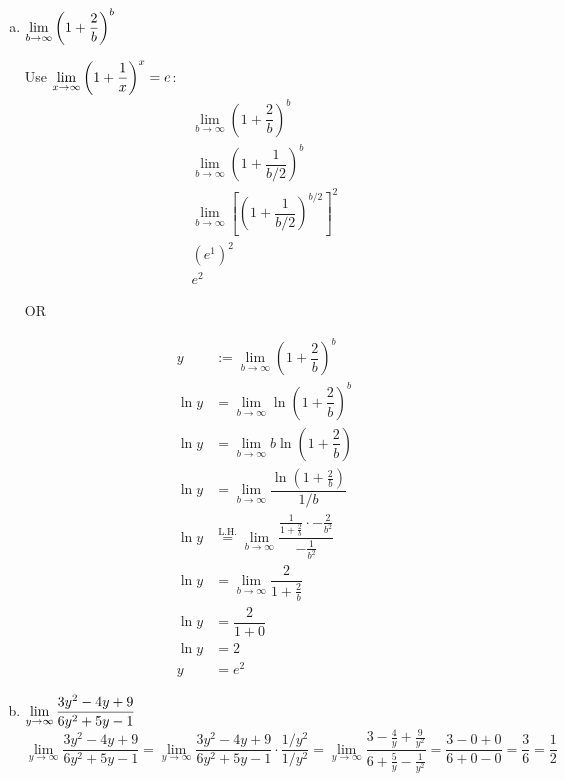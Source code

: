 \documentclass[12pt,letterpaper]{exam}
\newcommand{\lh}{\stackrel{\text{L.H.}}{=}}
\begin{document}
\begin{questions}
\begin{enumerate}[(a)]
	\newpage
	
	\item $\displaystyle\lim_{b \to \infty} \left(1 + \dfrac{2}{b} \right)^b$ \par\vspace{0.3cm}
	
		\begin{minipage}[b]{0.40\textwidth}
		Use $\displaystyle\lim_{x \to \infty} \left(1 + \frac{1}{x} \right)^x= e$:
			\[
			\begin{gathered}
			\lim_{b \to \infty} \left(1 + \dfrac{2}{b} \right)^b \\[0.2cm]
			\lim_{b \to \infty} \left(1 + \dfrac{1}{b/2} \right)^b \\[0.2cm]
			\lim_{b \to \infty} \left[\left(1 + \dfrac{1}{b/2} \right)^{b/2} \right]^2 \\[0.2cm]
			(e^1)^2 \\[0.2cm]
			e^2
			\end{gathered}
			\]
		\end{minipage}\begin{minipage}[b]{0.10\textwidth}
			OR
		\end{minipage}\begin{minipage}[b]{0.40\textwidth}
			\[
			\begin{aligned}
			y&:= \lim_{b \to \infty} \left(1 + \dfrac{2}{b} \right)^b \\[0.2cm]
			\ln y&= \lim_{b \to \infty} \ln \left(1 + \dfrac{2}{b} \right)^b \\[0.2cm]
			\ln y&= \lim_{b \to \infty} b \ln \left(1 + \dfrac{2}{b} \right) \\[0.2cm]
			\ln y&= \lim_{b \to \infty} \dfrac{\ln \left(1 + \frac{2}{b} \right)}{1/b} \\[0.2cm]
			\ln y&\lh \lim_{b \to \infty} \dfrac{\frac{1}{1 + \frac{2}{b}} \cdot -\frac{2}{b^2}}{-\frac{1}{b^2}} \\[0.2cm]
			\ln y&= \lim_{b \to \infty} \dfrac{2}{1 + \frac{2}{b}} \\[0.2cm]
			\ln y&= \dfrac{2}{1 + 0} \\[0.2cm]
			\ln y&= 2 \\[0.2cm]
			y&= e^2
			\end{aligned}
			\]
		\end{minipage} \pspace
	
	\item $\displaystyle\lim_{y \to \infty} \dfrac{3y^2 - 4y + 9}{6y^2 + 5y - 1}$ \pspace
		\[
		\lim_{y \to \infty} \dfrac{3y^2 - 4y + 9}{6y^2 + 5y - 1}= \lim_{y \to \infty} \dfrac{3y^2 - 4y + 9}{6y^2 + 5y - 1} \cdot \dfrac{1/y^2}{1/y^2}= \lim_{y \to \infty} \dfrac{3 - \frac{4}{y} + \frac{9}{y^2}}{6 + \frac{5}{y} - \frac{1}{y^2}}= \dfrac{3 - 0 + 0}{6 + 0 - 0}= \dfrac{3}{6}= \dfrac{1}{2}
		\] \par\vspace{0.3cm}
	

\end{enumerate}
\end{questions}
\end{document}
